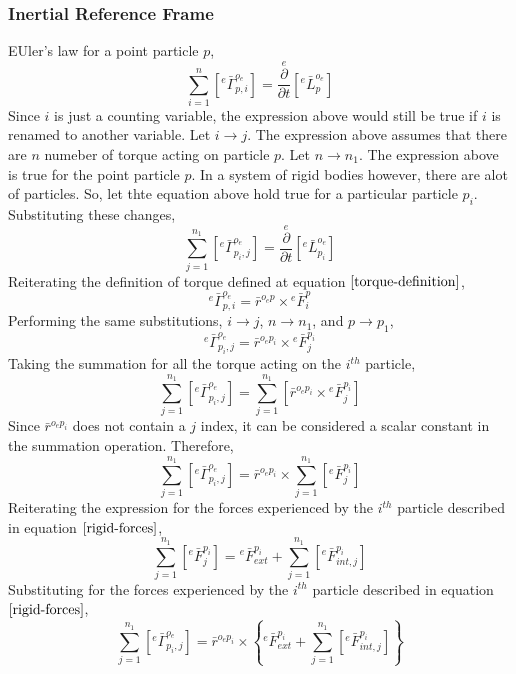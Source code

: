 \documentclass[class=report, 12pt, crop=false]{standalone}
\begin{document}
\begin{center}
\subsubsection{Inertial Reference Frame}
\begin{comment}
\end{comment}
EUler's law for a point particle $p$,
$$\sum^{n}_{i = 1}\left[{}^{e}\bar{\Gamma}^{o_{e}}_{p,i}\right] = \overset{e}{\frac{\partial}{\partial t}}\left[{}^{e}\bar{L}^{o_{e}}_{p}\right]$$
Since $i$ is just a counting variable, the expression above would still be true if $i$ is renamed to another variable. Let $i \to j$. The expression above assumes that there are $n$ numeber of torque acting on particle $p$. Let $n \to n_{1}$. The expression above is true for the point particle $p$. In a system of rigid bodies however, there are alot of particles. So, let thte equation above hold true for a particular particle $p_{i}$. Substituting these changes,
\begin{equation}\sum^{n_{1}}_{j = 1}\left[{}^{e}\bar{\Gamma}^{o_{e}}_{p_{i},j}\right] = \overset{e}{\frac{\partial}{\partial t}}\left[{}^{e}\bar{L}^{o_{e}}_{p_{i}}\right]\label{moments-rigid-1}\end{equation}
Reiterating the definition of torque defined at equation $\ref{torque-definition}$,
$${}^{e}\bar{\Gamma}^{o_{e}}_{p,i} = \bar{r}^{o_{e}p}\times{}^{e}\bar{F}^{p}_{i}$$
Performing the same substitutions, $i \to j$, $n \to n_{1}$, and $p \to p_{1}$,
$${}^{e}\bar{\Gamma}^{o_{e}}_{p_{i},j} = \bar{r}^{o_{e}p_{i}}\times{}^{e}\bar{F}^{p_{i}}_{j}$$
Taking the summation for all the torque acting on the $i^{th}$ particle,
$$\sum^{n_{1}}_{j = 1}\left[{}^{e}\bar{\Gamma}^{o_{e}}_{p_{i},j}\right] = \sum^{n_{1}}_{j = 1}\left[\bar{r}^{o_{e}p_{i}}\times{}^{e}\bar{F}^{p_{i}}_{j}\right]$$
Since $\bar{r}^{o_{e}p_{i}}$ does not contain a $j$ index, it can be considered a scalar constant in the summation operation. Therefore,
$$\sum^{n_{1}}_{j = 1}\left[{}^{e}\bar{\Gamma}^{o_{e}}_{p_{i},j}\right] = \bar{r}^{o_{e}p_{i}}\times\sum^{n_{1}}_{j = 1}\left[{}^{e}\bar{F}^{p_{i}}_{j}\right]$$
Reiterating the expression for the forces experienced by the $i^{th}$ particle described in equation $\ref{rigid-forces}$,
$$\sum^{n_{1}}_{j = 1}\left[{}^{e}\bar{F}^{p_{i}}_{j}\right] = {}^{e}\bar{F}^{p_{i}}_{ext} + \sum^{n_{1}}_{j = 1}\left[{}^{e}\bar{F}^{p_{i}}_{int,j}\right]\label{rigid-forces}$$
Substituting for the forces experienced by the $i^{th}$ particle described in equation $\ref{rigid-forces}$,
$$\sum^{n_{1}}_{j = 1}\left[{}^{e}\bar{\Gamma}^{o_{e}}_{p_{i},j}\right] = \bar{r}^{o_{e}p_{i}}\times\left\{{}^{e}\bar{F}^{p_{i}}_{ext} + \sum^{n_{1}}_{j = 1}\left[{}^{e}\bar{F}^{p_{i}}_{int,j}\right]\right\}$$

\end{center}
\end{document}
